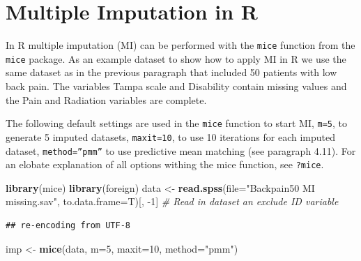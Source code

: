 \documentclass[
]{book}
\newenvironment{Shaded}{\begin{snugshade}}{\end{snugshade}}
\newcommand{\CommentTok}[1]{\textcolor[rgb]{0.56,0.35,0.01}{\textit{#1}}}
\newcommand{\DataTypeTok}[1]{\textcolor[rgb]{0.13,0.29,0.53}{#1}}
\newcommand{\DecValTok}[1]{\textcolor[rgb]{0.00,0.00,0.81}{#1}}
\newcommand{\KeywordTok}[1]{\textcolor[rgb]{0.13,0.29,0.53}{\textbf{#1}}}
\newcommand{\NormalTok}[1]{#1}
\newcommand{\StringTok}[1]{\textcolor[rgb]{0.31,0.60,0.02}{#1}}
\begin{document}
\hypertarget{multiple-imputation-in-r}{%
\section{Multiple Imputation in R}\label{multiple-imputation-in-r}}

In R multiple imputation (MI) can be performed with the \texttt{mice}
function from the \texttt{mice} package. As an example dataset to show
how to apply MI in R we use the same dataset as in the previous
paragraph that included 50 patients with low back pain. The variables
Tampa scale and Disability contain missing values and the Pain and
Radiation variables are complete.

The following default settings are used in the \texttt{mice} function to
start MI, \texttt{m=5}, to generate 5 imputed datasets,
\texttt{maxit=10}, to use 10 iterations for each imputed dataset,
\texttt{method=”pmm”} to use predictive mean matching (see paragraph
4.11). For an elobate explanation of all options withing the mice
function, see \texttt{?mice}.

\begin{Shaded}
\begin{Highlighting}[]
\KeywordTok{library}\NormalTok{(mice)}
\KeywordTok{library}\NormalTok{(foreign)}
\NormalTok{data <-}\StringTok{ }\KeywordTok{read.spss}\NormalTok{(}\DataTypeTok{file=}\StringTok{"Backpain50 MI missing.sav"}\NormalTok{, }\DataTypeTok{to.data.frame=}\NormalTok{T)[, }\DecValTok{-1}\NormalTok{] }\CommentTok{# Read in dataset an exclude ID variable}
\end{Highlighting}
\end{Shaded}

\begin{verbatim}
## re-encoding from UTF-8
\end{verbatim}

\begin{Shaded}
\begin{Highlighting}[]
\NormalTok{imp <-}\StringTok{ }\KeywordTok{mice}\NormalTok{(data, }\DataTypeTok{m=}\DecValTok{5}\NormalTok{, }\DataTypeTok{maxit=}\DecValTok{10}\NormalTok{, }\DataTypeTok{method=}\StringTok{"pmm"}\NormalTok{)}
\end{Highlighting}
\end{Shaded}
\end{document}
